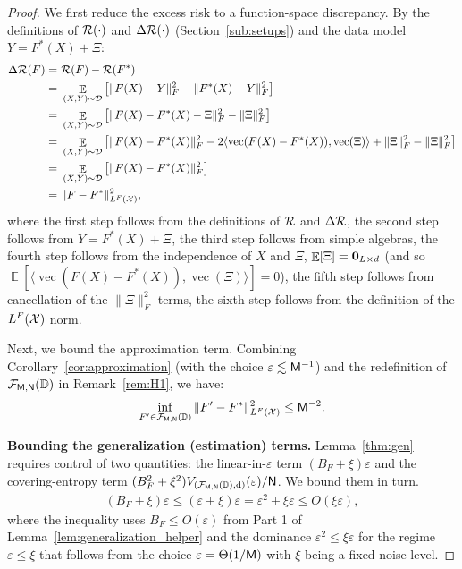 \documentclass[11pt]{article}
\theoremstyle{plain}
\DeclareMathOperator*{\E}{{\mathbb{E}}}
\DeclareMathOperator{\vect}{vec}
\begin{document}
\begin{proof}
    We first reduce the excess risk to a function-space discrepancy. By the definitions of ${\cal R}(\cdot)$ and $\Delta{\cal R}(\cdot)$ (Section~\ref{sub:setups}) and the data model $Y = F^*(X) + \Xi$:
    \begin{align}\label{eq:bound_delta_R}
        \Delta{\cal R}(F) = & ~ {\cal R}(F) - {\cal R}(F^*) \notag \\
        = & ~ \E_{(X, Y) \sim {\cal D}}\left[ \| F(X) - Y\|_F^2 - \| F^*(X) - Y\|_F^2 \right] \notag \\
        = & ~ \E_{(X, Y) \sim {\cal D}}\left[ \| F(X) - F^*(X) - \Xi\|_F^2 - \| \Xi \|_F^2 \right] \notag \\
        = & ~ \E_{(X, Y) \sim {\cal D}}\left[ \| F(X) - F^*(X) \|_F^2 - 2\langle \vect(F(X) - F^*(X)),\vect(\Xi)\rangle + \|\Xi\|_F^2 - \| \Xi \|_F^2 \right] \notag \\
        = & ~ \E_{(X, Y) \sim {\cal D}}\left[ \| F(X) - F^*(X) \|_F^2  \right]\notag  \\
        = & ~  \| F - F^* \|_{L^F({\cal X})}^2,
    \end{align}
    where the first step follows from the definitions of ${\cal R}$ and $\Delta {\cal R}$, the second step follows from $Y = F^*(X) + \Xi$, the third step follows from simple algebras, the fourth step follows from the independence of $X$ and $\Xi$, $\E[\Xi] = {\bf 0}_{L \times d}$ (and so $\E[\langle\vect(F(X) - F^*(X)),\vect(\Xi)\rangle]=0$), the fifth step follows from cancellation of the $\|\Xi\|_F^2$ terms, the sixth step follows from the definition of the $L^F({\cal X})$ norm.

    Next, we bound the approximation term. Combining Corollary~\ref{cor:approximation} (with the choice $\varepsilon \lesssim {\sf M}^{-1}$) and the redefinition of ${\cal F}_{\sf M, N}(\mathbb{D})$ in Remark~\ref{rem:H1}, we have:
    \begin{align}\label{eq:approx_term}
        \inf_{F' \in {\cal F}_{\sf M, N}(\mathbb{D})} \| F' - F^* \|_{L^F({\cal X})}^2 \leq {\sf M}^{-2}.
    \end{align}

    {\bf Bounding the generalization (estimation) terms.} Lemma~\ref{thm:gen} requires control of two quantities: the linear-in-$\varepsilon$ term $(B_F+\xi)\varepsilon$ and the covering-entropy term $(B_F^2+\xi^2) V_{({\cal F}_{\sf M, N}(\mathbb{D}),{\rm d})}(\varepsilon)/{\sf N}$. We bound them in turn.
    \begin{align}\label{eq:bf_xi_eps}
        (B_F+\xi)\varepsilon \leq (\varepsilon + \xi)\varepsilon = \varepsilon^2 + \xi\varepsilon \leq O(\xi\varepsilon),
    \end{align}
    where the inequality uses $B_F \leq O(\varepsilon)$ from Part 1 of Lemma~\ref{lem:generalization_helper} and the dominance $\varepsilon^2 \leq \xi\varepsilon$ for the regime $\varepsilon \leq \xi$ that follows from the choice $\varepsilon = \Theta(1/{\sf M})$ with $\xi$ being a fixed noise level.


\end{proof}
\end{document}
